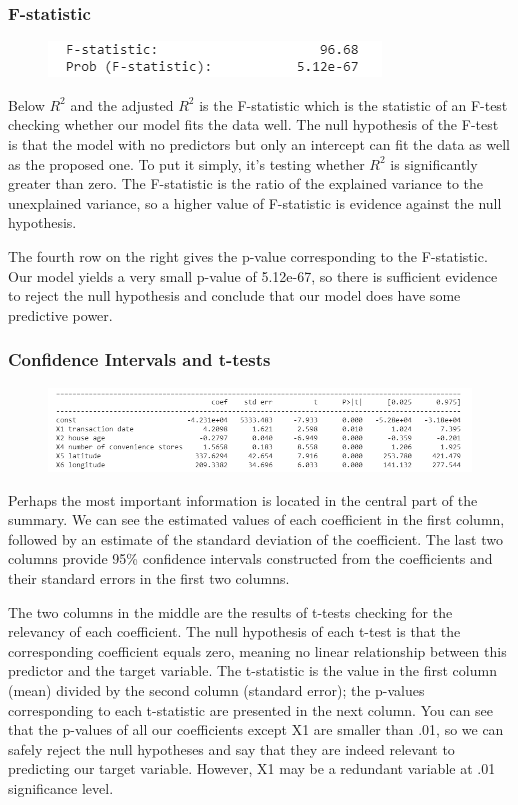 \documentclass{article}
\begin{document}
\subsubsection*{F-statistic}
\begin{figure}[H]\includegraphics[width=0.5\linewidth]{27}\end{figure}
Below $R^2$ and the adjusted $R^2$ is the F-statistic which is the statistic of an F-test checking whether our model fits the data well. The null hypothesis of the F-test is that the model with no predictors but only an intercept can fit the data as well as the proposed one. To put it simply, it's testing whether $R^2$ is significantly greater than zero. The F-statistic is the ratio of the explained variance to the unexplained variance, so a higher value of F-statistic is evidence against the null hypothesis.

The fourth row on the right gives the p-value corresponding to the F-statistic. Our model yields a very small p-value of 5.12e-67, so there is sufficient evidence to reject the null hypothesis and conclude that our model does have some predictive power.
\subsubsection*{Confidence Intervals and t-tests}
\begin{figure}[H]\includegraphics[width=\linewidth]{28}\end{figure}
Perhaps the most important information is located in the central part of the summary. We can see the estimated values of each coefficient in the first column, followed by an estimate of the standard deviation of the coefficient. The last two columns provide 95\% confidence intervals constructed from the coefficients and their standard errors in the first two columns.

The two columns in the middle are the results of t-tests checking for the relevancy of each coefficient. The null hypothesis of each t-test is that the corresponding coefficient equals zero, meaning no linear relationship between this predictor and the target variable. The t-statistic is the value in the first column (mean) divided by the second column (standard error); the p-values corresponding to each t-statistic are presented in the next column. You can see that the p-values of all our coefficients except X1 are smaller than .01, so we can safely reject the null hypotheses and say that they are indeed relevant to predicting our target variable. However, X1 may be a redundant variable at .01 significance level.
\end{document}
